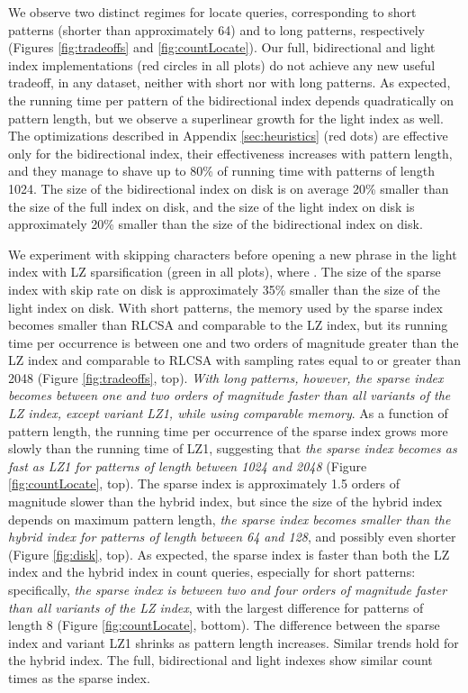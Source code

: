 \documentclass[a4paper,UKenglish]{lipics-v2016}
\begin{document}
We observe two distinct regimes for locate queries, corresponding to short patterns (shorter than approximately 64) and to long patterns, respectively (Figures \ref{fig:tradeoffs} and \ref{fig:countLocate}). Our full, bidirectional and light index implementations (red circles in all plots) do not achieve any new useful tradeoff, in any dataset, neither with short nor with long patterns. As expected, the running time per pattern of the bidirectional index depends quadratically on pattern length, but we observe a superlinear growth for the light index as well. The optimizations described in Appendix \ref{sec:heuristics} (red dots) are effective only for the bidirectional index, their effectiveness increases with pattern length, and they manage to shave up to 80\% of running time with patterns of length 1024. The size of the bidirectional index on disk is on average 20\% smaller than the size of the full index on disk, and the size of the light index on disk is approximately 20\% smaller than the size of the bidirectional index on disk.

We experiment with skipping  characters before opening a new phrase in the light index with LZ sparsification (green in all plots), where . The size of the sparse index with skip rate  on disk is approximately 35\% smaller than the size of the light index on disk. With short patterns, the memory used by the sparse index becomes smaller than RLCSA and comparable to the LZ index, but its running time per occurrence is between one and two orders of magnitude greater than the LZ index and comparable to RLCSA with sampling rates equal to or greater than 2048 (Figure \ref{fig:tradeoffs}, top). \emph{With long patterns, however, the sparse index becomes between one and two orders of magnitude faster than all variants of the LZ index, except variant LZ1, while using comparable memory}. As a function of pattern length, the running time per occurrence of the sparse index grows more slowly than the running time of LZ1, suggesting that \emph{the sparse index becomes as fast as LZ1 for patterns of length between 1024 and 2048} (Figure \ref{fig:countLocate}, top). The sparse index is approximately 1.5 orders of magnitude slower than the hybrid index, but since the size of the hybrid index depends on maximum pattern length, \emph{the sparse index becomes smaller than the hybrid index for patterns of length between 64 and 128}, and possibly even shorter (Figure \ref{fig:disk}, top). As expected, the sparse index is faster than both the LZ index and the hybrid index in count queries, especially for short patterns: specifically, \emph{the sparse index is between two and four orders of magnitude faster than all variants of the LZ index}, with the largest difference for patterns of length 8 (Figure \ref{fig:countLocate}, bottom). The difference between the sparse index and variant LZ1 shrinks as pattern length increases. Similar trends hold for the hybrid index. The full, bidirectional and light indexes show similar count times as the sparse index.
\end{document}
